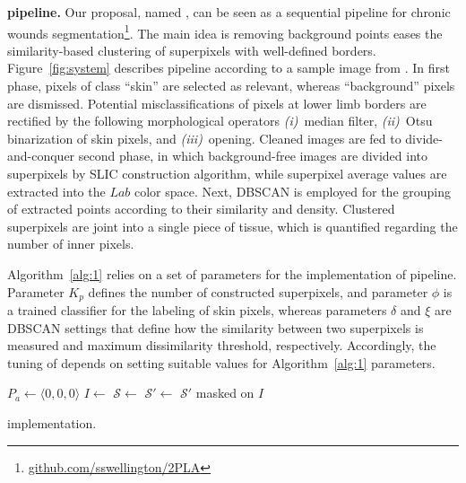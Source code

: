 \noindent
\textbf{\system pipeline.} 
Our proposal, named \system, can be seen as a sequential pipeline for chronic wounds segmentation\footnote{\url{github.com/sswellington/2PLA}}.
The main idea is removing background points eases the similarity-based clustering of superpixels with well-defined borders.
Figure~\ref{fig:system} describes \system pipeline according to a sample image from \dataset.
In \system first phase, pixels of class ``skin'' are selected as relevant, whereas ``background'' pixels are dismissed.
Potential misclassifications of pixels at lower limb borders are rectified by the following morphological operators 
\textit{(i)}~median filter, 
\textit{(ii)}~Otsu binarization of skin pixels, and 
\textit{(iii)}~opening.
Cleaned images are fed to \system  divide-and-conquer second phase, in which background-free images are divided into superpixels by SLIC construction algorithm, while superpixel average values are extracted into the $Lab$ color space.
Next, DBSCAN is employed for the grouping of extracted points according to their similarity and density.
Clustered superpixels are joint into a single piece of tissue, which is quantified regarding the number of inner pixels.

Algorithm~\ref{alg:1} relies on a set of parameters for the implementation of \system pipeline.
Parameter $K_p$ defines the number of constructed superpixels, and parameter $\phi$ is a trained classifier for the labeling of skin pixels, whereas parameters $\delta$ and $\xi$ are DBSCAN settings that define how the similarity between two superpixels is measured and maximum dissimilarity threshold, respectively.
Accordingly, the tuning of \system depends on setting suitable values for Algorithm~\ref{alg:1} parameters.
\vspace{-7px}

\begin{algorithm}[!htb]
\small
\hrulefill

 \vspace{-4px}
 \hrulefill
 
 $P_a \leftarrow \langle 0, 0, 0\rangle$\;
$I \leftarrow$ \;
$\mathcal{S} \leftarrow$ \;
$\mathcal{S'} \leftarrow$ \;
\Return $\mathcal{S'}$ masked on $I$\;
 \vspace{-4px}
\hrulefill
 \vspace{2px}
\caption{\system implementation.}
\label{alg:1}
\end{algorithm}
\vspace{-12px}



